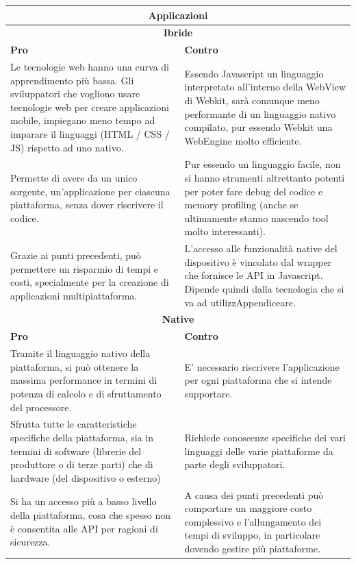 \begin{table}[h]
	\centering
	\begin{tabular}{|p{7.5cm}p{7.5cm}|}
		\hline
		\multicolumn{2}{|c|}{\textbf{Applicazioni}} \\ \hline
		\multicolumn{2}{|c|}{\cellcolor{black!10}\textbf{Ibride}}	  \\ \hline
  \cellcolor{green!35}
  \textbf{Pro} 
&
  \cellcolor{red!55}
  \textbf{Contro} 
\\ \hline
  \cellcolor{blue!25} 
  Le tecnologie web hanno una curva di apprendimento più bassa. Gli sviluppatori che vogliono usare tecnologie web per creare applicazioni mobile, impiegano meno tempo ad imparare il linguaggi (HTML / CSS / JS) rispetto ad uno nativo.
&
  \cellcolor{blue!10}
  Essendo Javascript un linguaggio interpretato all'interno della WebView di Webkit, sarà comunque meno performante di un linguaggio nativo compilato, pur essendo Webkit una WebEngine molto efficiente. 
\\
  \cellcolor{blue!10}
  Permette di avere da un unico sorgente, un'applicazione per ciascuna piattaforma, senza dover riscrivere il codice.
&
  \cellcolor{blue!25}
  Pur essendo un linguaggio facile, non si hanno strumenti altrettanto potenti 
  per poter fare debug del codice e memory profiling (anche se ultimamente stanno nascendo tool molto interessanti).
\\
  \cellcolor{blue!25}
  Grazie ai punti precedenti, può permettere un risparmio di tempi e costi, specialmente per la creazione di applicazioni multipiattaforma.
&
  \cellcolor{blue!10}
  L'accesso alle funzionalità native del dispositivo è vincolato dal wrapper che fornisce le API in Javascript. Dipende quindi dalla tecnologia che si va ad utilizzAppendiceare.
\\\hline		
        \multicolumn{2}{|c|}{\cellcolor{black!10}\textbf{Native}} \\ \hline
  \cellcolor{green!35}
  \textbf{Pro} 
& 
  \cellcolor{red!55}
  \textbf{Contro} 
\\ \hline
  \cellcolor{blue!10}
  Tramite il linguaggio nativo della piattaforma, si può ottenere la massima performance in termini di potenza di calcolo e di sfruttamento del processore. 
& 
  \cellcolor{blue!25}
  E’ necessario riscrivere l'applicazione per ogni piattaforma che si intende supportare.
\\
  \cellcolor{blue!25}
  Sfrutta tutte le caratteristiche specifiche della piattaforma, sia in termini di software (librerie del produttore o di terze parti) che di hardware (del dispositivo o esterno)
&
  \cellcolor{blue!10}
  Richiede conoscenze specifiche dei vari linguaggi delle varie piattaforme da parte degli sviluppatori.
\\
  \cellcolor{blue!10}
  Si ha un accesso più a basso livello della piattaforma, cosa che spesso non è consentita alle API per ragioni di sicurezza.
&
  \cellcolor{blue!25}
  A causa dei punti precedenti può comportare un maggiore costo complessivo e l'allungamento dei tempi di sviluppo, in particolare dovendo gestire più piattaforme.
\\ \hline
 

\end{tabular}
\end{table}
